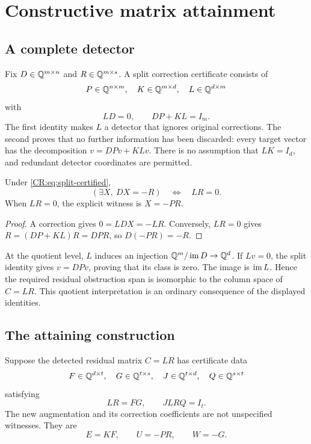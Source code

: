 \section{Constructive matrix attainment}\label{CR:cr-source-section-9}\label{CR:ch:matrix-attainment}
\subsection{A complete detector}
Fix $D\in\mathbb{Q}^{m\times n}$ and $R\in\mathbb{Q}^{m\times s}$. A split correction certificate consists of
\[
 P\in\mathbb{Q}^{n\times m},\quad K\in\mathbb{Q}^{m\times d},\quad L\in\mathbb{Q}^{d\times m}
\]
with
\begin{equation}\label{CR:eq:split-certified}
 LD=0,\qquad DP+KL=I_m.
\end{equation}
The first identity makes $L$ a detector that ignores original corrections. The second proves that no further information has been discarded: every target vector has the decomposition $v=DPv+KLv$. There is no assumption that $LK=I_d$, and redundant detector coordinates are permitted.

\begin{CRtheorem}\label{CR:thm:split-exact}
Under \eqref{CR:eq:split-certified},
\[
 (\exists X,\ DX=-R)\quad\Longleftrightarrow\quad LR=0.
\]
When $LR=0$, the explicit witness is $X=-PR$.
\end{CRtheorem}
\begin{proof}
A correction gives $0=LDX=-LR$. Conversely, $LR=0$ gives $R=(DP+KL)R=DPR$, so $D(-PR)=-R$.
\end{proof}

At the quotient level, $L$ induces an injection $\mathbb{Q}^m/\operatorname{im} D\to\mathbb{Q}^d$. If $Lv=0$, the split identity gives $v=DPv$, proving that its class is zero. The image is $\operatorname{im} L$. Hence the required residual obstruction span is isomorphic to the column space of $C=LR$. This quotient interpretation is an ordinary consequence of the displayed identities.

\subsection{The attaining construction}
Suppose the detected residual matrix $C=LR$ has certificate data
\[
 F\in\mathbb{Q}^{d\times t},\quad G\in\mathbb{Q}^{t\times s},\quad
 J\in\mathbb{Q}^{t\times d},\quad Q\in\mathbb{Q}^{s\times t}
\]
satisfying
\begin{equation}\label{CR:eq:factor-certified}
 LR=FG,\qquad JLRQ=I_t.
\end{equation}
The new augmentation and its correction coefficients are not unspecified witnesses. They are
\begin{equation}\label{CR:eq:attaining-formula}
 \boxed{E=KF,\qquad U=-PR,\qquad W=-G.}
\end{equation}

